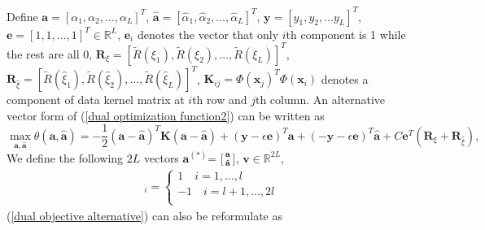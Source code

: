 Define $\mathbf{a}=[\alpha_{1},\alpha_{2}, \ldots, \alpha_{L}]^{T} $, $\mathbf{\hat{a}}=[\hat{\alpha}_{1},\hat{\alpha}_{2}, \ldots, \hat{\alpha}_{L}]^{T} $, $\mathbf{y}=[y_{1}, y_{2}, \ldots y_{L}]^{T}$, $ \mathbf{e}=[1,1,\ldots,1]^{T}\in \mathbb{R}^{L}$, $\mathbf{e}_{i}$ denotes the vector that only $i$th component is 1 while the rest are all 0, $\mathbf{R}_{\xi}=[\tilde{R}(\xi_{1}), \tilde{R}(\xi_{2}), \ldots, \tilde{R}(\xi_{L})]^{T}$, $\mathbf{R}_{\hat{\xi}}=[\tilde{R}(\hat{\xi}_{1}), \tilde{R}(\hat{\xi}_{2}), \ldots, \tilde{R}(\hat{\xi}_{L})]^{T}$, $\mathbf{K}_{ij}=\Phi(\mathbf{x}_{j})^{T}\Phi(\mathbf{x}_{i})$ denotes a component of data kernel matrix at $i$th row and $j$th column. An alternative vector form of (\ref{dual optimization function2}) can be written as 
\begin{equation}
\max_{\mathbf{a}, \hat{\mathbf{a}}}\theta(\mathbf{a},\hat{\mathbf{a}})=-\frac{1}{2}(\mathbf{a}-\mathbf{\hat{a}})^{T}\mathbf{K}(\mathbf{a}-\mathbf{\hat{a}})+(\mathbf{y}-\epsilon \mathbf{e})^{T}\mathbf{a}+(-\mathbf{y}-\epsilon\mathbf{e})^{T}\mathbf{\hat{a}}+C\mathbf{e}^{T}(\mathbf{R}_{\xi}+\mathbf{R}_{\hat{\xi}}),
\label{dual objective alternative}
\end{equation} 
We define the following $2L$ vectors 
$\mathbf{a}^{(*)}$= [$\mathbf{a} \atop \mathbf{\hat{a}}$], $\mathbf{v}\in \mathbb{R}^{2L}$, 
\begin{eqnarray}
[\mathbf{v}]_{i}=\left\{\begin{array}{ll}
1\quad i=1,\ldots, l\\
-1\quad i=l+1,\ldots, 2l\\ 
\end{array}\right.
\end{eqnarray}
(\ref{dual objective alternative}) can also be reformulate as 

